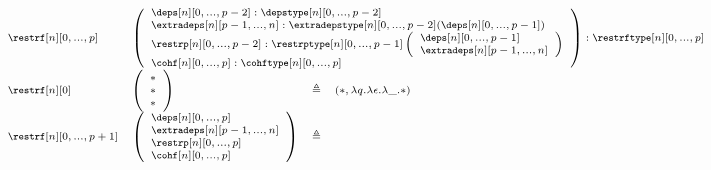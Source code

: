 \documentclass{msc}
\newcommand{\unitpoint}{\ensuremath{\ast}}
\newcommand{\defeq}{\ensuremath{\triangleq}}
\begin{document}
\begin{equation*}
  \fontsize{7.2}{9}\selectfont
  \begin{array}{llcl}
    \restrf[n][0,...,p]                                                           &
    \multicolumn{3}{l}{
      \left(\begin{array}{l}
                \deps[n][0,...,p-2]:\depstype[n][0,...,p-2]                                \\
                \extradeps[n][p-1,...,n]:\extradepstype[n][0,...,p-2](\deps[n][0,...,p-1]) \\
                \restrp[n][0,...,p-2]:\restrptype[n][0,...,p-1]
                \left(\begin{array}{l}
                    \deps[n][0,...,p-1]      \\
                    \extradeps[n][p-1,...,n] \\
                  \end{array}\right)                                             \\
                \cohf[n][0,...,p]:\cohftype[n][0,...,p]
              \end{array}\right) : \restrftype[n][0,...,p]
    }                                                                                                                                                         \\
    \restrf[n][0]                                                                 &
    \left(\begin{array}{l}
              \unitpoint \\
              \unitpoint \\
              \unitpoint \\
            \end{array}\right)                                                        & \defeq & (\unitpoint,\lambda q. \lambda\epsilon. \lambda \_.\unitpoint) \\
    \restrf[n][0,...,p+1]                                                         &
    \left(\begin{array}{l}
              \deps[n][0,...,p]        \\
              \extradeps[n][p-1,...,n] \\
              \restrp[n][0,...,p]      \\
              \cohf[n][0,...,p]        \\
            \end{array}\right)                                                   & \defeq &

\end{array}
\end{equation*}
\end{document}
